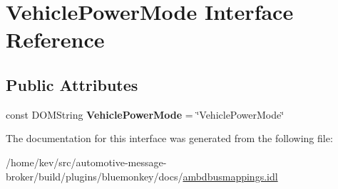 \hypertarget{interfaceVehiclePowerMode}{\section{Vehicle\+Power\+Mode Interface Reference}
\label{interfaceVehiclePowerMode}
}
\subsection*{Public Attributes}
\begin{DoxyCompactItemize}
\item 
\hypertarget{interfaceVehiclePowerMode_a2c1c72402fa6c44c2bc9e8fd68bdc190}{const D\+O\+M\+String {\bfseries Vehicle\+Power\+Mode} = \char`\"{}Vehicle\+Power\+Mode\char`\"{}}\label{interfaceVehiclePowerMode_a2c1c72402fa6c44c2bc9e8fd68bdc190}

\end{DoxyCompactItemize}


The documentation for this interface was generated from the following file\+:\begin{DoxyCompactItemize}
\item 
/home/kev/src/automotive-\/message-\/broker/build/plugins/bluemonkey/docs/\hyperlink{ambdbusmappings_8idl}{ambdbusmappings.\+idl}\end{DoxyCompactItemize}

